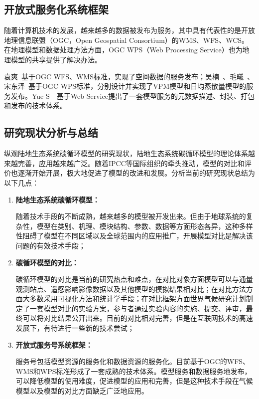 \subsection{开放式服务化系统框架}
随着计算机技术的发展，越来越多的数据被发布为服务，其中具有代表性的是开放地理信息联盟（OGC，Open Geospatial Consortium）的WMS、WFS、WCS。在地理模型和数据处理方法方面，OGC WPS（Web Processing Service）也为地理模型的共享提供了解决办法。 %

袁爽~\cite{袁爽2010空间数据}基于OGC WFS、WMS标准，实现了空间数据的服务发布；吴楠~\cite{吴楠2012基于}、毛曦~\cite{毛曦2012基于}、宋东泽~\cite{宋东泽2015一个生态传感网的}基于OGC WPS标准，分别设计并实现了VPM模型和日均蒸散量模型的服务发布。Yue S~\cite{Yue2013Key}~\cite{Yue2015A}基于Web Service提出了一套模型服务的元数据描述、封装、打包和发布的技术体系。

\subsection{研究现状分析与总结}
纵观陆地生态系统碳循环模型的研究现状，陆地生态系统碳循环模型的理论体系越来越完善，应用越来越广泛。随着IPCC等国际组织的牵头推动，模型的对比和评价也逐渐开始开展，极大地促进了模型的改进和发展。分析当前的研究现状总结为以下几点：

\begin{enumerate}[(1)]
\item \textbf{陆地生态系统碳循环模型：}

随着技术手段的不断成熟，越来越多的模型被开发出来。但由于地球系统的复杂性，模型在类别、机理、模块结构、参数、数据等方面形态各异，这种多样性阻碍了模型在不同区域以及全球范围内的应用推广，开展模型对比是解决该问题的有效技术手段；

\item \textbf{碳循环模型的对比：}

碳循环模型的对比是当前的研究热点和难点，在对比对象方面模型可以与通量观测站点、遥感影响影像数据以及其他模型的模拟结果相对比；在对比方法方面大多数采用可视化方法和统计学手段；在对比框架方面世界气候研究计划制定了一套模型对比的实验方案，参与者通过实验内容的实施、提交、评审，最终可以将对比结果公开出来。目前的对比相对完善，但是在互联网技术的高速发展下，有待进行一些新的技术尝试；

\item \textbf{开放式服务号系统框架：}

服务号包括模型资源的服务化和数据资源的服务化。目前基于OGC的WFS、WMS和WPS标准形成了一套成熟的技术体系。模型服务和数据服务地发布，可以降低模型的使用难度，促进模型的应用和完善，但是这种技术手段在气候模型以及模型的对比方面缺乏广泛地应用。
\end{enumerate}

